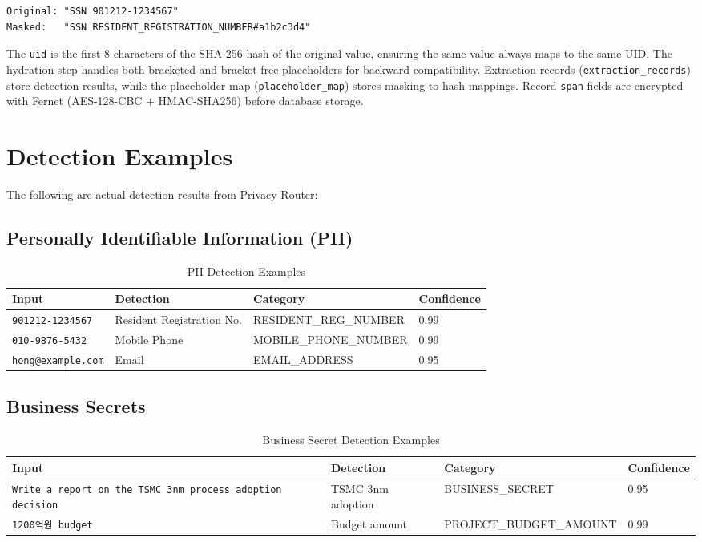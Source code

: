 \documentclass[11pt,a4paper]{article}
\begin{document}
\begin{verbatim}
Original: "SSN 901212-1234567"
Masked:   "SSN RESIDENT_REGISTRATION_NUMBER#a1b2c3d4"
\end{verbatim}

The \texttt{uid} is the first 8 characters of the SHA-256 hash of the original value, ensuring the same value always maps to the same UID. The hydration step handles both bracketed and bracket-free placeholders for backward compatibility. Extraction records (\texttt{extraction\_records}) store detection results, while the placeholder map (\texttt{placeholder\_map}) stores masking-to-hash mappings. Record \texttt{span} fields are encrypted with Fernet (AES-128-CBC + HMAC-SHA256) before database storage.

\section{Detection Examples}

The following are actual detection results from Privacy Router:

\subsection{Personally Identifiable Information (PII)}

\begin{table}[h]
\centering
\begin{tabular}{@{}llll@{}}
\toprule
Input & Detection & Category & Confidence \\
\midrule
\texttt{901212-1234567} & Resident Registration No. & RESIDENT\_REG\_NUMBER & 0.99 \\
\texttt{010-9876-5432} & Mobile Phone & MOBILE\_PHONE\_NUMBER & 0.99 \\
\texttt{hong@example.com} & Email & EMAIL\_ADDRESS & 0.95 \\
\bottomrule
\end{tabular}
\caption{PII Detection Examples}
\end{table}

\subsection{Business Secrets}

\begin{table}[h]
\centering
\begin{tabular}{@{}p{5cm}lll@{}}
\toprule
Input & Detection & Category & Confidence \\
\midrule
\texttt{Write a report on the TSMC 3nm process adoption decision} & TSMC 3nm adoption & BUSINESS\_SECRET & 0.95 \\
\texttt{1200억원 budget} & Budget amount & PROJECT\_BUDGET\_AMOUNT & 0.99 \\
\bottomrule
\end{tabular}
\caption{Business Secret Detection Examples}
\end{table}
\end{document}
